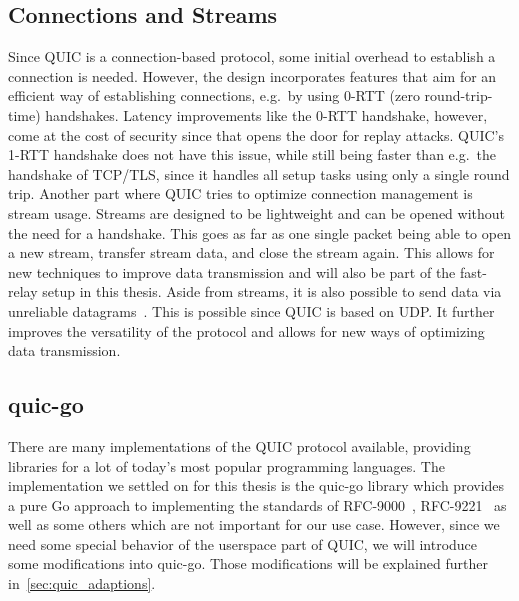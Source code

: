\subsection{Connections and Streams}
Since QUIC is a connection-based protocol, some initial overhead to establish a connection is needed.
However, the design incorporates features that aim for an efficient way of establishing 
connections, e.g.\ by using 0-RTT (zero round-trip-time) handshakes. 
Latency improvements like the 0-RTT handshake, however, come at the cost of security since that opens 
the door for replay attacks.
QUIC's 1-RTT handshake does not have this issue, while still being faster
than e.g.\ the handshake of TCP/TLS, since it handles all setup tasks using only
a single round trip.
Another part where QUIC tries to optimize connection management is stream usage.
Streams are designed to be lightweight and can be opened without the need for a handshake.
This goes as far as one single packet being able to open a new stream, transfer stream data,
and close the stream again.
This allows for new techniques to improve data transmission and will also be part of the fast-relay 
setup in this thesis.
Aside from streams, it is also possible to send data via unreliable 
datagrams~\parencite{rfc-9221}.
This is possible since QUIC is based on UDP\@.
It further improves the versatility of the protocol and allows 
for new ways of optimizing data transmission.

\subsection{quic-go}
There are many implementations of the QUIC protocol available, providing libraries for a lot of 
today's most popular programming languages.
The implementation we settled on for this thesis is the quic-go library which provides a pure Go 
approach to implementing the standards of RFC-9000~\parencite{rfc-9000}, 
RFC-9221~\parencite{rfc-9221} as well as some others which are not 
important for our use case. 
However, since we need some special behavior of the userspace part of QUIC, we will introduce some 
modifications into quic-go.  
Those modifications will be explained further in~\autoref{sec:quic_adaptions}.

